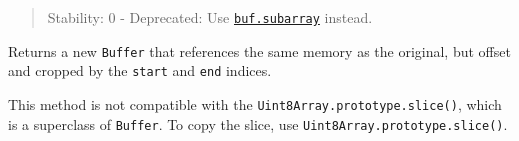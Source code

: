 \begin{quote}
Stability: 0 - Deprecated: Use
\hyperref[bufsubarraystart-end]{\texttt{buf.subarray}} instead.
\end{quote}

Returns a new \texttt{Buffer} that references the same memory as the
original, but offset and cropped by the \texttt{start} and \texttt{end}
indices.

This method is not compatible with the
\texttt{Uint8Array.prototype.slice()}, which is a superclass of
\texttt{Buffer}. To copy the slice, use
\texttt{Uint8Array.prototype.slice()}.

\begin{Shaded}
\begin{Highlighting}[]
\NormalTok{ \{ }\NormalTok{ \} } \OperatorTok{;}

\OperatorTok{=} \NormalTok{(}\NormalTok{)}\OperatorTok{;}

\OperatorTok{=} \OperatorTok{;}
\NormalTok{copiedBuf[}\NormalTok{]}\OperatorTok{++;}
\NormalTok{())}\OperatorTok{;}

\NormalTok{())}\OperatorTok{;}

\OperatorTok{=}\NormalTok{()}\OperatorTok{;}
\NormalTok{notReallyCopiedBuf[}\NormalTok{]}\OperatorTok{++;}
\NormalTok{())}\OperatorTok{;}
\NormalTok{())}\OperatorTok{;}
\end{Highlighting}
\end{Shaded}

